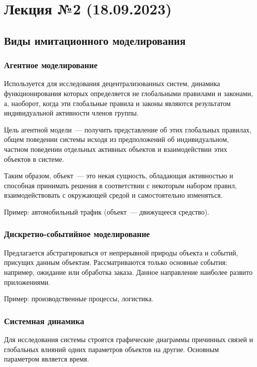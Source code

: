 \section{Лекция №2 (18.09.2023)}

\subsection{Виды имитационного моделирования}

\subsubsection{Агентное моделирование}

Используется для исследования децентрализованных систем, динамика функционирования которых определяется не глобальными правилами и законами, а, наоборот, когда эти глобальные правила и законы являются результатом индивидуальной активности членов группы.

Цель агентной модели~--- получить представление об этих глобальных правилах, общем поведении системы исходя из предположений об индивидуальном, частном поведении отдельных активных объектов и взаимодействии этих объектов в системе.

Таким образом, объект~--- это некая сущность, обладающая активностью и способная принимать решения в соответствии с некоторым набором правил, взаимодействовать с окружающей средой и самостоятельно изменяться.

Пример: автомобильный трафик (объект~--- движущееся средство).

\subsubsection{Дискретно-событийное моделирование}

Предлагается абстрагироваться от непрерывной природы объекта и событий, присущих данным объектам. Рассматриваются только основные события: например, ожидание или обработка заказа. Данное направление наиболее развито приложениями.

Пример: производственные процессы, логистика.

\subsubsection{Системная динамика}

Для исследования системы строятся графические диаграммы причинных связей и глобальных влияний одних параметров объектов на другие. Основным параметром является время.

